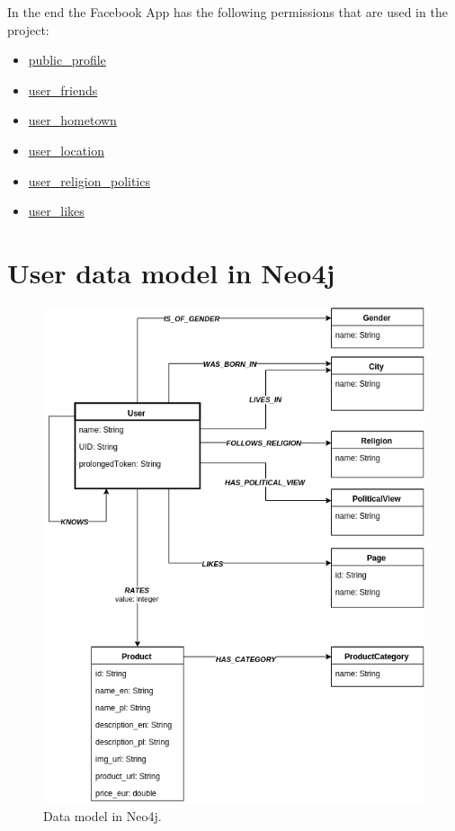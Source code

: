 \documentclass[12pt]{report}
\begin{document}
In the end the Facebook App has the following permissions that are used in the project:
\begin{itemize}
\item \url{public_profile}
\item \url{user_friends}
\item \url{user_hometown}
\item \url{user_location}
\item \url{user_religion_politics}
\item \url{user_likes}
\end{itemize}




\section{User data model in Neo4j}

\begin{figure}[!t]
\centering
\includegraphics[width=\textwidth]{neo4j_data_model3.png} 
\caption[Data model in Neo4j.]{Data model in Neo4j.}
\label{fig.data_model}
\end{figure}
\end{document}

